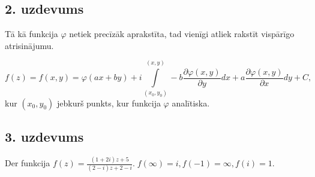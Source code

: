 \documentclass[a4paper,12pt]{article}
\begin{document}
\subsection*{2. uzdevums}
Tā kā funkcija $\varphi$ netiek precīzāk aprakstīta, tad vienīgi atliek rakstīt vispārīgo atrisinājumu.

$$
f(z) =f(x,y)= \varphi(ax + by) + i\int\limits_{(x_0,y_0)}^{(x,y)} -b\frac{\partial\varphi(x,y)}{\partial y} dx + a \frac{\partial \varphi(x,y)}{\partial x} dy + C,
$$
kur $(x_0,y_0)$ jebkurš punkts, kur funkcija $\varphi$ analītiska.
\subsection*{3. uzdevums}
Der funkcija $f(z) = \frac{(1+2i)z + 5}{(2-i)z + 2-i}. \;  f(\infty) = i, f(-1) = \infty, f(i) = 1.$  
\end{document}

